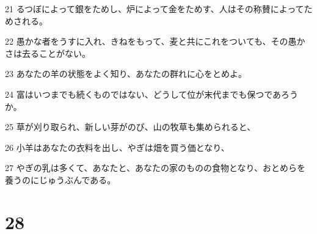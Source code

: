 \par 21 るつぼによって銀をためし、炉によって金をためす、人はその称賛によってためされる。
\par 22 愚かな者をうすに入れ、きねをもって、麦と共にこれをついても、その愚かさは去ることがない。
\par 23 あなたの羊の状態をよく知り、あなたの群れに心をとめよ。
\par 24 富はいつまでも続くものではない、どうして位が末代までも保つであろうか。
\par 25 草が刈り取られ、新しい芽がのび、山の牧草も集められると、
\par 26 小羊はあなたの衣料を出し、やぎは畑を買う価となり、
\par 27 やぎの乳は多くて、あなたと、あなたの家のものの食物となり、おとめらを養うのにじゅうぶんである。

\chapter{28}

